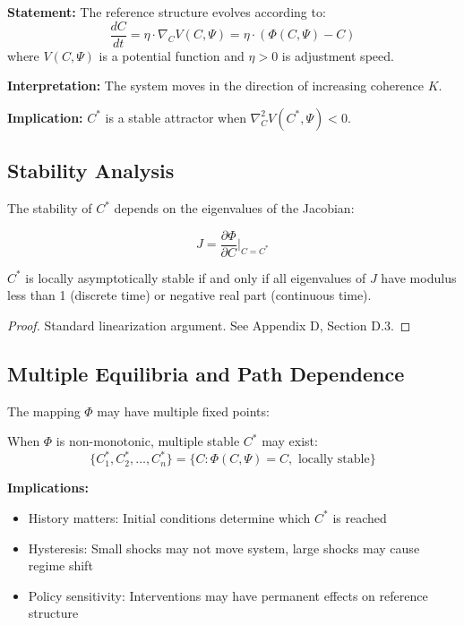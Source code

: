 \begin{tcolorbox}[colback=gray!5!white, colframe=gray!75!black,
    title=Axiom AZ-D1: Gradient Adjustment Dynamics]
\textbf{Statement:} The reference structure evolves according to:
\begin{equation}
\frac{dC}{dt} = \eta \cdot \nabla_C V(C, \Psi) = \eta \cdot (\Phi(C, \Psi) - C)
\end{equation}
where $V(C, \Psi)$ is a potential function and $\eta > 0$ is adjustment speed.

\textbf{Interpretation:} The system moves in the direction of increasing coherence $K$.

\textbf{Implication:} $C^*$ is a stable attractor when $\nabla^2_C V(C^*, \Psi) < 0$.
\end{tcolorbox}

\subsection{Stability Analysis}

The stability of $C^*$ depends on the eigenvalues of the Jacobian:

\begin{equation}
J = \frac{\partial \Phi}{\partial C}\bigg|_{C=C^*}
\end{equation}

\begin{proposition}
$C^*$ is locally asymptotically stable if and only if all eigenvalues of $J$
have modulus less than 1 (discrete time) or negative real part (continuous time).
\end{proposition}

\begin{proof}
Standard linearization argument. See Appendix D, Section D.3.
\end{proof}

\subsection{Multiple Equilibria and Path Dependence}

The mapping $\Phi$ may have multiple fixed points:

\begin{tcolorbox}[colback=yellow!5!white, colframe=yellow!75!black,
    title=Result AZ-D2: Multiplicity of $C^*$]
When $\Phi$ is non-monotonic, multiple stable $C^*$ may exist:
\begin{equation}
\{C^*_1, C^*_2, \ldots, C^*_n\} = \{C : \Phi(C, \Psi) = C, \text{ locally stable}\}
\end{equation}

\textbf{Implications:}
\begin{itemize}[nosep]
\item History matters: Initial conditions determine which $C^*$ is reached
\item Hysteresis: Small shocks may not move system, large shocks may cause regime shift
\item Policy sensitivity: Interventions may have permanent effects on reference structure
\end{itemize}
\end{tcolorbox}

